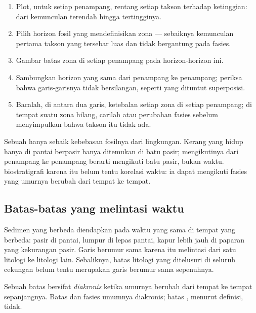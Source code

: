 \begin{method}\label{met:b1:stratigraphic-scale:biozones}
\begin{enumerate}
  \item Plot, untuk setiap penampang, rentang setiap takson terhadap ketinggian: dari kemunculan terendah hingga tertingginya.
  \item Pilih horizon fosil yang mendefinisikan zona --- sebaiknya kemunculan pertama takson yang tersebar luas dan tidak bergantung pada fasies.
  \item Gambar batas zona di setiap penampang pada horizon-horizon ini.
  \item Sambungkan horizon yang sama dari penampang ke penampang; periksa bahwa garis-garisnya tidak bersilangan, seperti yang dituntut superposisi.
  \item Bacalah, di antara dua garis, ketebalan setiap zona di setiap penampang; di tempat suatu zona hilang, carilah  atau perubahan fasies sebelum menyimpulkan bahwa takson itu tidak ada.
\end{enumerate}
\end{method}

Sebuah  hanya sebaik kebebasan fosilnya dari lingkungan. Kerang yang hidup hanya di pantai berpasir hanya ditemukan di batu pasir; mengikutinya dari penampang ke penampang berarti mengikuti batu pasir, bukan waktu.  biostratigrafi karena itu belum tentu korelasi waktu: ia dapat mengikuti fasies yang umurnya berubah dari tempat ke tempat.

\subsection*{Batas-batas yang melintasi waktu}

Sedimen yang berbeda diendapkan pada waktu yang sama di tempat yang berbeda: pasir di pantai, lumpur di lepas pantai, kapur lebih jauh di paparan yang kekurangan pasir. Garis berumur sama karena itu melintasi dari satu litologi ke litologi lain. Sebaliknya, batas litologi yang ditelusuri di seluruh cekungan belum tentu merupakan garis berumur sama sepenuhnya.

\begin{definition}\label{def:b1:stratigraphic-scale:diachronous}
Sebuah batas bersifat \emph{diakronis} ketika umurnya berubah dari tempat ke tempat sepanjangnya. Batas  dan fasies umumnya diakronis; batas , menurut definisi, tidak.
\end{definition}

